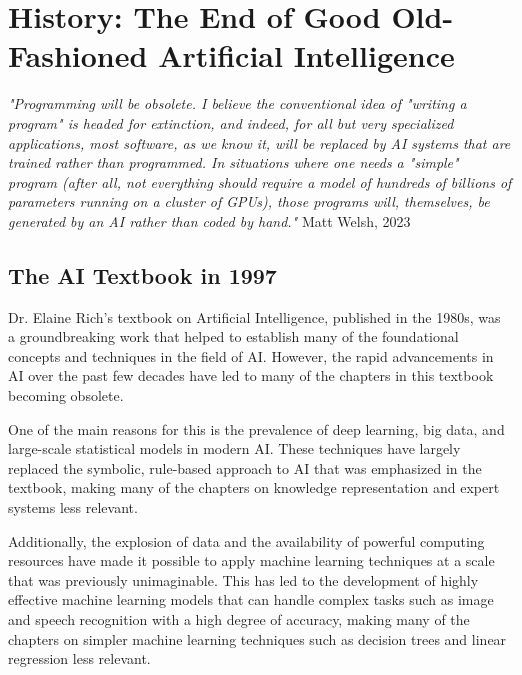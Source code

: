 \setchapterpreamble[u]{\margintoc}
\chapter{History: The End of Good Old-Fashioned Artificial Intelligence}

\textit{"Programming will be obsolete. I believe the conventional idea of "writing a program" is headed for extinction, and indeed, for all but very specialized applications, most software, as we know it, will be replaced by AI systems that are trained rather than programmed. In situations where one needs a "simple" program (after all, not everything should require a model of hundreds of billions of parameters running on a cluster of GPUs), those programs will, themselves, be generated by an AI rather than coded by hand."} Matt Welsh, 2023 \cite{welsh2023}

\section{The AI Textbook in 1997}

Dr. Elaine Rich's textbook on Artificial Intelligence, published in the 1980s, was a groundbreaking work that helped to establish many of the foundational concepts and techniques in the field of AI. However, the rapid advancements in AI over the past few decades have led to many of the chapters in this textbook becoming obsolete.

One of the main reasons for this is the prevalence of deep learning, big data, and large-scale statistical models in modern AI. These techniques have largely replaced the symbolic, rule-based approach to AI that was emphasized in the textbook, making many of the chapters on knowledge representation and expert systems less relevant.

Additionally, the explosion of data and the availability of powerful computing resources have made it possible to apply machine learning techniques at a scale that was previously unimaginable. This has led to the development of highly effective machine learning models that can handle complex tasks such as image and speech recognition with a high degree of accuracy, making many of the chapters on simpler machine learning techniques such as decision trees and linear regression less relevant.  


